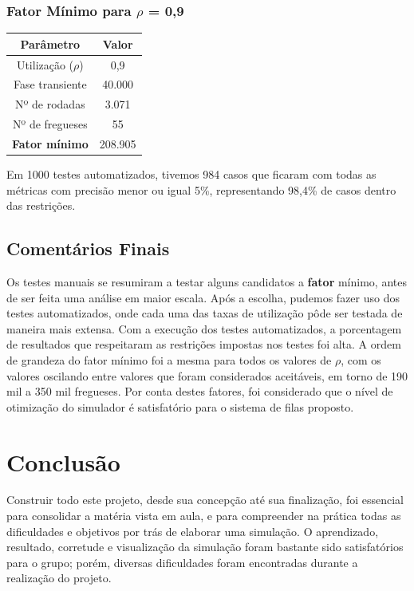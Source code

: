 \documentclass[a4paper,12pt]{report}
\begin{document}
\subsection{Fator Mínimo para $\rho$ = 0,9}
\begin{center}
\begin{tabular}{ c c }
  \hline
  \textbf{Parâmetro} & \textbf{Valor}\\
  \hline
  Utilização ($\rho$) & 0,9\\
  Fase transiente & 40.000\\
  Nº de rodadas & 3.071\\
  Nº de fregueses & 55\\
  \hline
  \textbf{Fator mínimo} & 208.905\\
  \hline
\end{tabular}
\end{center}

Em 1000 testes automatizados, tivemos 984 casos que ficaram com todas as métricas com precisão menor ou igual 5\%, representando 98,4\% de casos dentro das restrições.

\section{Comentários Finais}

Os testes manuais se resumiram a testar alguns candidatos a \textbf{fator} mínimo, antes de ser feita uma análise em maior escala. Após a escolha, pudemos fazer uso dos testes automatizados, onde cada uma das taxas de utilização pôde ser testada de maneira mais extensa. Com a execução dos testes automatizados, a porcentagem de resultados que respeitaram as restrições impostas nos testes foi alta. A ordem de grandeza do fator mínimo foi a mesma para todos os valores de $\rho$, com os valores oscilando entre valores que foram considerados aceitáveis, em torno de 190 mil a 350 mil fregueses. Por conta destes fatores, foi considerado que o nível de otimização do simulador é satisfatório para o sistema de filas proposto.

\chapter{Conclusão}

Construir todo este projeto, desde sua concepção até sua finalização, foi essencial para consolidar a matéria vista em aula, e para compreender na prática todas as dificuldades e objetivos por trás de elaborar uma simulação. O aprendizado, resultado, corretude e visualização da simulação foram bastante sido satisfatórios para o grupo; porém, diversas dificuldades foram encontradas durante a realização do projeto.
\end{document}
